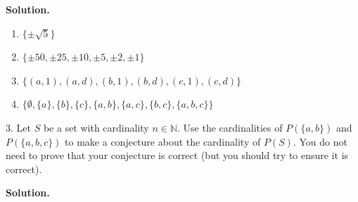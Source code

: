 \documentclass[10pt,]{book}
\theoremstyle{plain}
\theoremstyle{definition}
\theoremstyle{definition}
\theoremstyle{definition}
\theoremstyle{definition}
\numberwithin{equation}{section}
\def\N{\mathbb{N}}
\begin{document}
\begin{exerciselist}
\par\smallskip
\par\smallskip
\noindent\textbf{Solution.}\hypertarget{solution-2}{}\quad
\leavevmode%
\begin{enumerate}[label=(\alph*)]
\item\hypertarget{li-35}{}
          \(\{\pm\sqrt{5}\}\)
\item\hypertarget{li-36}{}
          \(\{\pm 50, \pm 25, \pm 10, \pm 5, \pm 2, \pm 1\}\)
\item\hypertarget{li-37}{}
          \(\{(a,1),(a,d), (b,1),(b,d),(c,1),(c,d)\}\)
\item\hypertarget{li-38}{}
          \(\{\emptyset, \{a\}, \{b\},
          \{c\},\{a,b\},\{a,c\},\{b,c\}, \{a,b,c\}\}\)
\end{enumerate}
\item[3.]\hypertarget{exercise-3}{}
        Let \(S\) be a set with cardinality \(n\in \N\). Use the cardinalities of \(P(\{a,b\})\) and \(P(\{a,b,c\})\) to make a conjecture about the cardinality of \(P(S)\). You do not need to prove that your conjecture is correct (but you should try to ensure it is correct).
\par\smallskip
\par\smallskip
\noindent\textbf{Solution.}\hypertarget{solution-3}{}\quad


\end{exerciselist}
\end{document}
